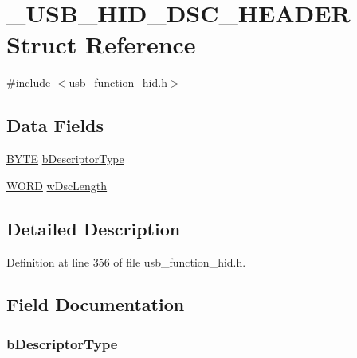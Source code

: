 \hypertarget{struct___u_s_b___h_i_d___d_s_c___h_e_a_d_e_r}{}\section{\+\_\+\+U\+S\+B\+\_\+\+H\+I\+D\+\_\+\+D\+S\+C\+\_\+\+H\+E\+A\+D\+E\+R Struct Reference}
\label{struct___u_s_b___h_i_d___d_s_c___h_e_a_d_e_r}


{\ttfamily \#include $<$usb\+\_\+function\+\_\+hid.\+h$>$}

\subsection*{Data Fields}
\begin{DoxyCompactItemize}
\item 
\hyperlink{_generic_type_defs_8h_a4ae1dab0fb4b072a66584546209e7d58}{B\+Y\+T\+E} \hyperlink{struct___u_s_b___h_i_d___d_s_c___h_e_a_d_e_r_ac1d02ce6fe165032044fb81602a9b07c}{b\+Descriptor\+Type}
\item 
\hyperlink{_generic_type_defs_8h_a2b0e863dadf920709ec53d9088ee7c91}{W\+O\+R\+D} \hyperlink{struct___u_s_b___h_i_d___d_s_c___h_e_a_d_e_r_a580c2c8478960a9680c876c6226d2820}{w\+Dsc\+Length}
\end{DoxyCompactItemize}


\subsection{Detailed Description}


Definition at line 356 of file usb\+\_\+function\+\_\+hid.\+h.



\subsection{Field Documentation}
\hypertarget{struct___u_s_b___h_i_d___d_s_c___h_e_a_d_e_r_ac1d02ce6fe165032044fb81602a9b07c}{}
\subsubsection[{b\+Descriptor\+Type}]{ b\+Descriptor\+Type}\label{struct___u_s_b___h_i_d___d_s_c___h_e_a_d_e_r_ac1d02ce6fe165032044fb81602a9b07c}


